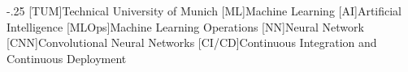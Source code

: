 \documentclass[headsepline,footsepline,footinclude=false,oneside,fontsize=11pt,paper=a4,listof=totoc,bibliography=totoc]{scrbook} %
\begin{document}


\frontmatter{}





\tableofcontents{}

\mainmatter{}







%
\appendix{}


\begin{acronym}
	\itemsep-.25\baselineskip
	[TUM]{Technical University of Munich}
	[ML]{Machine Learning}
	[AI]{Artificial Intelligence}
	[MLOps]{Machine Learning Operations}
	[NN]{Neural Network}
	[CNN]{Convolutional Neural Networks}
	[CI/CD]{Continuous Integration and Continuous Deployment}
\end{acronym}

\listoffigures{}
\listoftables{}
\printbibliography{}
\end{document}
